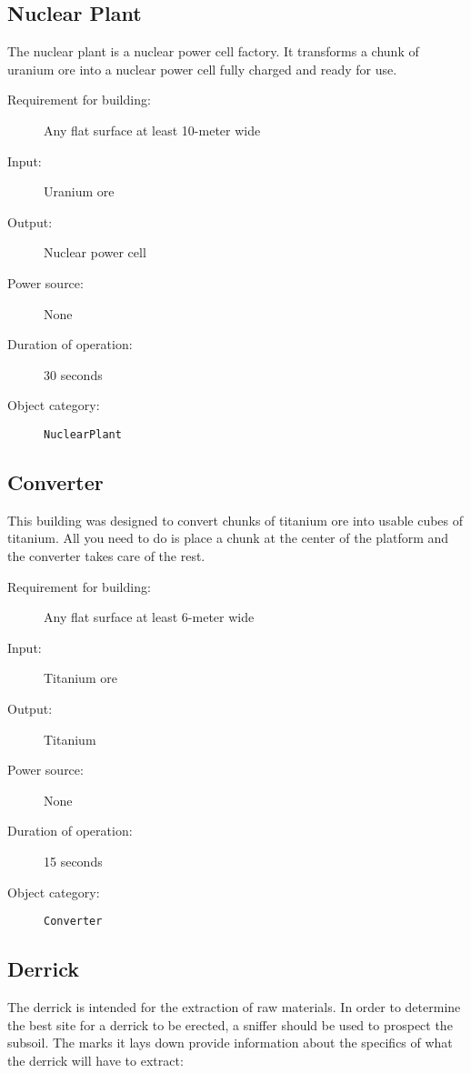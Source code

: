 \subsection{Nuclear Plant}

The nuclear plant is a nuclear power cell factory. It transforms a chunk of uranium ore into a nuclear power cell fully charged and ready for use.

\begin{description}
    \item[Requirement for building:] Any flat surface at least 10-meter wide
    \item[Input:] Uranium ore
    \item[Output:] Nuclear power cell
    \item[Power source:] None
    \item[Duration of operation:] 30 seconds
    \item[Object category:] \texttt{NuclearPlant}
\end{description}


\subsection{Converter}

This building was designed to convert chunks of titanium ore into usable cubes of titanium. All you need to do is place a chunk at the center of the platform and the converter takes care of the rest.

\begin{description}
    \item[Requirement for building:] Any flat surface at least 6-meter wide
    \item[Input:] Titanium ore
    \item[Output:] Titanium
    \item[Power source:] None
    \item[Duration of operation:] 15 seconds
    \item[Object category:] \texttt{Converter}
\end{description}


\subsection{Derrick}

The derrick is intended for the extraction of raw materials. In order to determine the best site for a derrick to be erected, a sniffer should be used to prospect the subsoil. The marks it lays down provide information about the specifics of what the derrick will have to extract:

